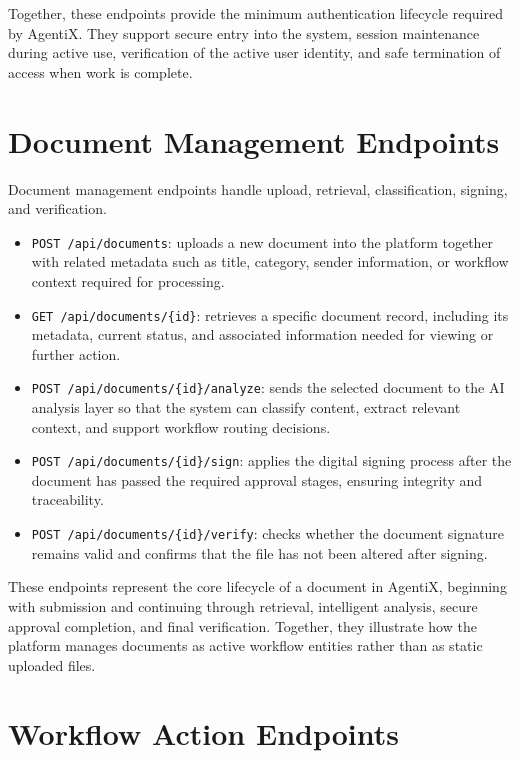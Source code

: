 \documentclass[12pt,oneside,openright,a4paper]{cpe-english-project}
\begin{document}
Together, these endpoints provide the minimum authentication lifecycle required by AgentiX. They support secure entry into the system, session maintenance during active use, verification of the active user identity, and safe termination of access when work is complete.

\section{Document Management Endpoints}

Document management endpoints handle upload, retrieval, classification, signing, and verification.

\begin{itemize}
  \item \texttt{POST /api/documents}: uploads a new document into the platform together with related metadata such as title, category, sender information, or workflow context required for processing.
  \item \texttt{GET /api/documents/\{id\}}: retrieves a specific document record, including its metadata, current status, and associated information needed for viewing or further action.
  \item \texttt{POST /api/documents/\{id\}/analyze}: sends the selected document to the AI analysis layer so that the system can classify content, extract relevant context, and support workflow routing decisions.
  \item \texttt{POST /api/documents/\{id\}/sign}: applies the digital signing process after the document has passed the required approval stages, ensuring integrity and traceability.
  \item \texttt{POST /api/documents/\{id\}/verify}: checks whether the document signature remains valid and confirms that the file has not been altered after signing.
\end{itemize}

These endpoints represent the core lifecycle of a document in AgentiX, beginning with submission and continuing through retrieval, intelligent analysis, secure approval completion, and final verification. Together, they illustrate how the platform manages documents as active workflow entities rather than as static uploaded files.

\section{Workflow Action Endpoints}
\end{document}
